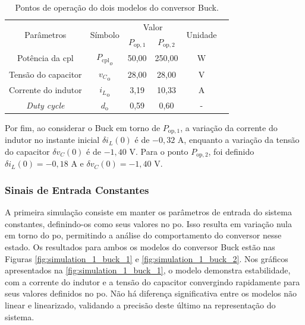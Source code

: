 \vspace{8pt}
\begin{table}[H]
  \centering
  \setlength{\tabcolsep}{10pt}
  \begin{tabular}{cccccc}
    \toprule
    \multirow{2}{*}{\centering Parâmetros} & \multirow{2}{*}{\centering Símbolo} & \multicolumn{2}{c}{\centering Valor} & \multirow{2}{*}{\centering Unidade} \\
    \cmidrule{3-4}
     &  & $P_{\mathrm{op}, 1}$ & $P_{\mathrm{op}, 2}$ &  \\
    \midrule
    Potência da \acrshort{cpl} & ${P_{\mathrm{cpl}}}_o$ & 50,00  & 250,00 & W \\
    Tensão do capacitor & ${v_C}_{\mathrm{o}}$ & 28,00 & 28,00  & V \\
    Corrente do indutor & ${i_L}_{\mathrm{o}}$ & 3,19 & 10,33 & A \\
    \textit{Duty cycle} & $d_{\mathrm{o}}$ & 0,59 & 0,60 & - \\  
    \bottomrule
  \end{tabular}
  \caption{Pontos de operação do dois modelos do conversor Buck.}
  \label{table:op_parameters_buck}
\end{table}

Por fim, ao considerar o Buck em torno de $P_{\mathrm{op}, 1}$, a variação da corrente do indutor no instante inicial $\delta i_{L}(0)$ é de $-0,32 \textrm{ A}$, enquanto a variação da tensão do capacitor $\delta v_{C}(0)$ é de $-1,40 \textrm{ V}$. Para o ponto $P_{\mathrm{op}, 2}$, foi definido $\delta i_{L}(0) = -0,18 \textrm{ A}$ e $\delta v_{C}(0) = -1,40 \textrm{ V}$. 

\subsubsection{Sinais de Entrada Constantes}

A primeira simulação consiste em manter os parâmetros de entrada do sistema constantes, definindo-os como seus valores no \acrshort{po}. Isso resulta em variação nula em torno do \acrshort{po}, permitindo a análise do comportamento do conversor nesse estado. Os resultados para ambos os modelos do conversor Buck estão nas Figuras \ref{fig:simulation_1_buck_1} e \ref{fig:simulation_1_buck_2}. Nos gráficos apresentados na \autoref{fig:simulation_1_buck_1}, o modelo demonstra estabilidade, com a corrente do indutor e a tensão do capacitor convergindo rapidamente para seus valores definidos no \acrshort{po}. Não há diferença significativa entre os modelos não linear e linearizado, validando a precisão deste último na representação do sistema.


